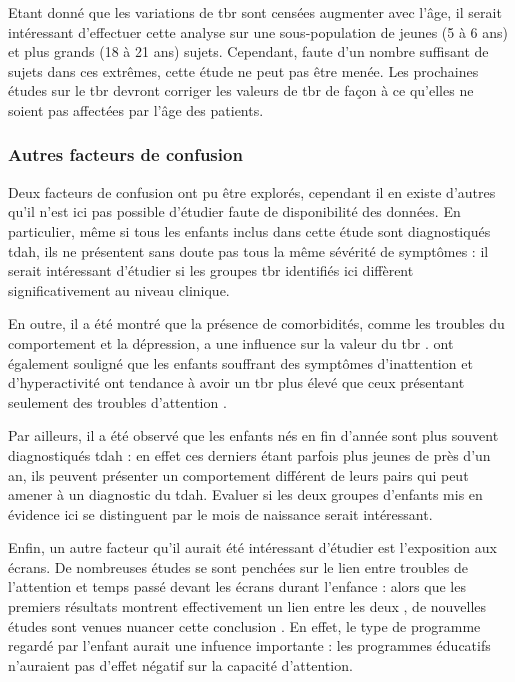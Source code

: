 Etant donné que les variations de \gls{tbr} sont censées augmenter avec l'âge, il serait intéressant d'effectuer cette analyse sur une sous-population de jeunes (5 
à 6 ans) et plus grands (18 à 21 ans) sujets. Cependant, faute d'un nombre suffisant de sujets dans ces extrêmes, cette étude ne peut pas être menée. Les prochaines
études sur le \gls{tbr} devront corriger les valeurs de \gls{tbr} de façon à ce qu'elles ne soient pas affectées par l'âge des patients.

\subsubsection{Autres facteurs de confusion}

Deux facteurs de confusion ont pu être explorés, cependant il en existe d'autres qu'il n'est ici pas possible d'étudier faute de disponibilité des données.
En particulier, même si tous les enfants inclus dans cette étude sont diagnostiqués \gls{tdah}, ils ne présentent sans doute pas tous la même sévérité de symptômes : il serait
intéressant d'étudier si les groupes \gls{tbr} identifiés ici diffèrent significativement au niveau clinique. 

En outre, il a été montré que la présence de comorbidités, comme les troubles du comportement et la dépression, a une influence sur la valeur du \gls{tbr} \citep{Loo2013}. 
\citet{Barry2003erp} ont également souligné que les enfants souffrant des symptômes d'inattention et d'hyperactivité ont tendance à avoir un \gls{tbr} plus élevé que ceux présentant seulement des
troubles d'attention .  

Par ailleurs, il a été observé que les enfants nés en fin d'année sont plus souvent diagnostiqués \gls{tdah} \citep{Layton2018} : en effet ces derniers 
étant parfois plus jeunes de près d'un an, ils peuvent présenter un comportement différent de leurs pairs qui peut amener à un diagnostic du \gls{tdah}. Evaluer si 
les deux groupes d'enfants mis en évidence ici se distinguent par le mois de naissance serait intéressant.

Enfin, un autre facteur qu'il aurait été intéressant d'étudier est l'exposition aux écrans. De nombreuses études se sont penchées sur le lien 
entre troubles de l'attention et temps passé devant les écrans durant l'enfance : alors que les premiers résultats montrent effectivement un lien 
entre les deux \citep{Swing2010, Christakis2004}, de nouvelles études sont venues nuancer cette conclusion \citep{Schmidt2008, Lillard2011, Zimmerman2007, Kostyrka2017}.
En effet, le type de programme regardé par l'enfant aurait une infuence importante : les programmes éducatifs n'auraient pas d'effet négatif sur 
la capacité d'attention.


